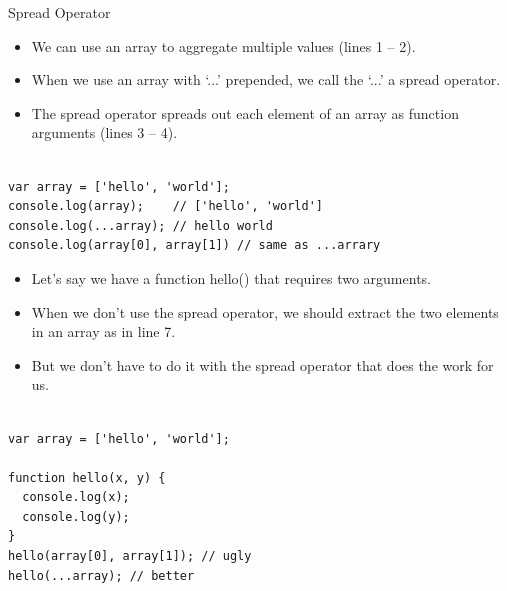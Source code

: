 \begin{frame}[fragile]{Spread Operator}

\begin{itemize}
	\item We can use an array to aggregate multiple values (lines 1 -- 2).
	\item When we use an array with `...' prepended, we call the `...' a spread operator. 
	\item The spread operator spreads out each element of an array as function arguments (lines 3 -- 4).  
\end{itemize}

\begin{Code}{}%
\begin{lstlisting}[firstnumber=1, label=glabels, xleftmargin=0pt, basicstyle=\scriptsize]% 

var array = ['hello', 'world'];
console.log(array);    // ['hello', 'world']
console.log(...array); // hello world
console.log(array[0], array[1]) // same as ...arrary
\end{lstlisting}%
\end{Code}%

\end{frame}

\begin{frame}[fragile]{}

\begin{itemize}
	\item Let's say we have a function hello() that requires two arguments. 
	\item When we don't use the spread operator, we should extract the two elements in an array as in line 7.
	\item But we don't have to do it with the spread operator that does the work for us. 
\end{itemize}

\begin{Code}{}%
\begin{lstlisting}[firstnumber=1, label=glabels, xleftmargin=0pt, basicstyle=\scriptsize]% 

var array = ['hello', 'world'];

function hello(x, y) {
  console.log(x);
  console.log(y);
}
hello(array[0], array[1]); // ugly
hello(...array); // better

\end{lstlisting}%
\end{Code}%

\end{frame}


